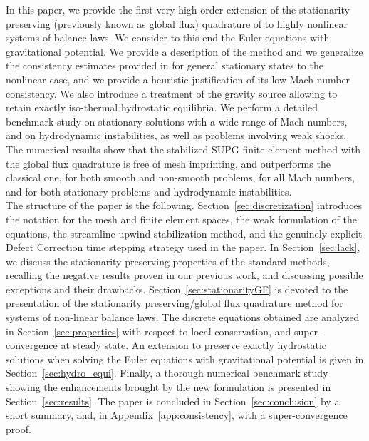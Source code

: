 \documentclass[a4paper,10pt]{article}
\begin{document}
In this paper, we provide the first very high order extension of the stationarity preserving (previously known as global flux) quadrature of   \cite{barsukow2025structure}  to  highly nonlinear systems of balance laws.
We consider to this end the Euler equations with gravitational potential. 
We provide a description of the method and we generalize
the consistency estimates provided in  \cite{barsukow2025structure} for general stationary states to the nonlinear case, and we provide a heuristic
justification of its low Mach number consistency. 
We also introduce a treatment of the gravity source allowing to retain exactly iso-thermal hydrostatic equilibria.
We perform a detailed benchmark study on stationary solutions with
a wide range of Mach numbers, and on hydrodynamic instabilities, as well as problems involving weak shocks. 
The numerical results show that  the stabilized SUPG finite element method with the global flux quadrature is free of mesh imprinting,   
and outperforms 
the classical one, for both smooth and non-smooth problems, for all Mach numbers,  and  for both stationary  problems and hydrodynamic instabilities.\\

The structure of the paper is the following. Section~\ref{sec:discretization} introduces the notation for the mesh and finite element spaces, the weak formulation of the equations,
the streamline upwind stabilization method, and the genuinely explicit Defect Correction time stepping strategy used in the paper.
In Section~\ref{sec:lack}, we  discuss the  stationarity preserving properties of the standard methods, recalling the negative results proven in our previous work, 
and discussing possible exceptions and their drawbacks. Section~\ref{sec:stationarityGF} is devoted to the  presentation of the stationarity preserving/global flux quadrature method for systems
of  non-linear balance laws. The discrete equations obtained are analyzed in Section~\ref{sec:properties} with respect to local conservation,   and super-convergence at steady state.
An extension to preserve   exactly hydrostatic solutions when solving the Euler equations with gravitational potential is given in Section~\ref{sec:hydro_equi}.
Finally, a thorough numerical benchmark study showing the enhancements brought by the new formulation is presented in Section~\ref{sec:results}. The paper is concluded in Section~\ref{sec:conclusion} by a short summary,
and, in Appendix~\ref{app:consistency}, with a super-convergence proof.
\end{document}
